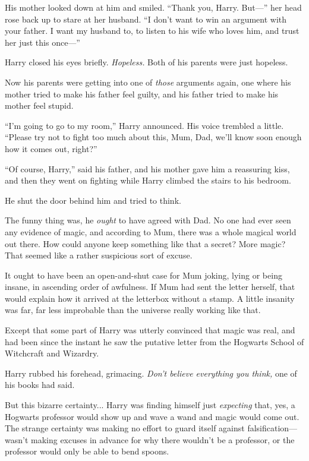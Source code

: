 His mother looked down at him and smiled. “Thank you, Harry. But—” her head rose back up to stare at her husband. “I don’t want to win an argument with your father. I want my husband to, to listen to his wife who loves him, and trust her just this once—”

Harry closed his eyes briefly. \emph{Hopeless.} Both of his parents were just hopeless.

Now his parents were getting into one of \emph{those} arguments again, one where his mother tried to make his father feel guilty, and his father tried to make his mother feel stupid.

“I’m going to go to my room,” Harry announced. His voice trembled a little. “Please try not to fight too much about this, Mum, Dad, we’ll know soon enough how it comes out, right?”

“Of course, Harry,” said his father, and his mother gave him a reassuring kiss, and then they went on fighting while Harry climbed the stairs to his bedroom.

He shut the door behind him and tried to think.

The funny thing was, he \emph{ought} to have agreed with Dad. No one had ever seen any evidence of magic, and according to Mum, there was a whole magical world out there. How could anyone keep something like that a secret? More magic? That seemed like a rather suspicious sort of excuse.

It ought to have been an open-and-shut case for Mum joking, lying or being insane, in ascending order of awfulness. If Mum had sent the letter herself, that would explain how it arrived at the letterbox without a stamp. A little insanity was far, far less improbable than the universe really working like that.

Except that some part of Harry was utterly convinced that magic was real, and had been since the instant he saw the putative letter from the Hogwarts School of Witchcraft and Wizardry.

Harry rubbed his forehead, grimacing. \emph{Don’t believe everything you think,} one of his books had said.

But this bizarre certainty... Harry was finding himself just \emph{expecting} that, yes, a Hogwarts professor would show up and wave a wand and magic would come out. The strange certainty was making no effort to guard itself against falsification—wasn’t making excuses in advance for why there wouldn’t be a professor, or the professor would only be able to bend spoons.

